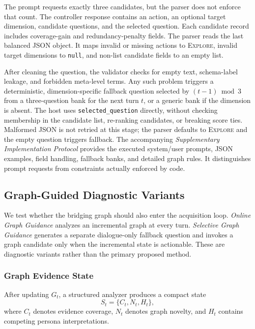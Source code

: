 \documentclass{ieeeaccess}
\begin{document}
The prompt requests exactly three candidates, but the parser does not enforce that count.
The controller response contains an action, an optional target dimension,
candidate questions, and the selected question. Each candidate record includes coverage-gain
and redundancy-penalty fields. The parser reads the last balanced JSON object. It maps
invalid or missing actions to \textsc{Explore}, invalid target dimensions to \texttt{null},
and non-list candidate fields to an empty list.

After cleaning the question, the validator checks for empty text, schema-label leakage,
and forbidden meta-level terms. Any such problem triggers a deterministic, dimension-specific
fallback question selected by $(t-1)\bmod 3$ from a three-question bank for the next
turn $t$, or a generic bank if the dimension is absent. The host uses
\texttt{selected\_question} directly, without checking membership in the candidate list,
re-ranking candidates, or breaking score ties. Malformed JSON is not retried at this
stage; the parser defaults to \textsc{Explore} and the empty question triggers fallback.
The accompanying \textit{Supplementary Implementation Protocol} provides the executed
system/user prompts, JSON examples, field handling, fallback banks, and detailed graph
rules. It distinguishes prompt requests from constraints actually enforced by code.



\subsection{Graph-Guided Diagnostic Variants}
\label{subsec:adaptive_interviewing}

We test whether the bridging graph should also enter the acquisition loop. \textit{Online
Graph Guidance} analyzes an incremental graph at every turn. \textit{Selective Graph
Guidance} generates a separate dialogue-only fallback question and invokes a graph candidate
only when the incremental state is actionable. These are diagnostic variants rather than the
primary proposed method.

\subsubsection{Graph Evidence State}

After updating $G_t$, a structured analyzer produces a compact state
\begin{equation}
S_t=\{C_t,N_t,H_t\},
\label{eq:gai_state}
\end{equation}
where $C_t$ denotes evidence coverage, $N_t$ denotes graph novelty, and $H_t$ contains
competing persona interpretations.
\end{document}
